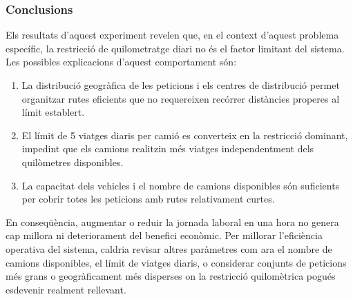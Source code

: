 \subsubsection{Conclusions}

Els resultats d'aquest experiment revelen que, en el context d'aquest problema específic, la restricció de quilometratge diari no és el factor limitant del sistema. Les possibles explicacions d'aquest comportament són:

\begin{enumerate}
    \item La distribució geogràfica de les peticions i els centres de distribució permet organitzar rutes eficients que no requereixen recórrer distàncies properes al límit establert.
    \item El límit de 5 viatges diaris per camió es converteix en la restricció dominant, impedint que els camions realitzin més viatges independentment dels quilòmetres disponibles.
    \item La capacitat dels vehicles i el nombre de camions disponibles són suficients per cobrir totes les peticions amb rutes relativament curtes.
\end{enumerate}

En conseqüència, augmentar o reduir la jornada laboral en una hora no genera cap millora ni deteriorament del benefici econòmic. Per millorar l'eficiència operativa del sistema, caldria revisar altres paràmetres com ara el nombre de camions disponibles, el límit de viatges diaris, o considerar conjunts de peticions més grans o geogràficament més disperses on la restricció quilomètrica pogués esdevenir realment rellevant.